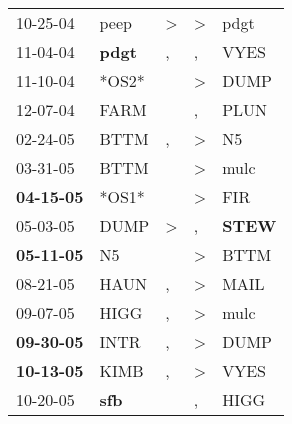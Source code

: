 \begin{supertabular}{p{0.07\textwidth}p{0.06\textwidth}p{0.02\textwidth}p{0.02\textwidth}p{0.06\textwidth}}
          10-25-04\textsuperscript{} &           peep\textsuperscript{} &     \textgreater &     \textgreater &           pdgt\textsuperscript{} \\
          11-04-04\textsuperscript{} &  \textbf{pdgt\textsuperscript{}} &                , &                , &           VYES\textsuperscript{} \\
          11-10-04\textsuperscript{} &                            *OS2* &                  &     \textgreater &           DUMP\textsuperscript{} \\
          12-07-04\textsuperscript{} &           FARM\textsuperscript{} &                  &                , &           PLUN\textsuperscript{} \\
          02-24-05\textsuperscript{} &           BTTM\textsuperscript{} &                , &     \textgreater &             N5\textsuperscript{} \\
          03-31-05\textsuperscript{} &           BTTM\textsuperscript{} &                  &     \textgreater &           mulc\textsuperscript{} \\
 \textbf{04-15-05\textsuperscript{}} &                            *OS1* &                  &     \textgreater &            FIR\textsuperscript{} \\
          05-03-05\textsuperscript{} &           DUMP\textsuperscript{} &     \textgreater &                , &  \textbf{STEW\textsuperscript{}} \\
 \textbf{05-11-05\textsuperscript{}} &             N5\textsuperscript{} &                  &     \textgreater &           BTTM\textsuperscript{} \\
          08-21-05\textsuperscript{} &           HAUN\textsuperscript{} &                , &     \textgreater &           MAIL\textsuperscript{} \\
          09-07-05\textsuperscript{} &           HIGG\textsuperscript{} &                , &     \textgreater &           mulc\textsuperscript{} \\
 \textbf{09-30-05\textsuperscript{}} &           INTR\textsuperscript{} &                , &     \textgreater &           DUMP\textsuperscript{} \\
 \textbf{10-13-05\textsuperscript{}} &           KIMB\textsuperscript{} &                , &     \textgreater &           VYES\textsuperscript{} \\
          10-20-05\textsuperscript{} &   \textbf{sfb\textsuperscript{}} &                  &                , &           HIGG\textsuperscript{} \\

\end{supertabular}
